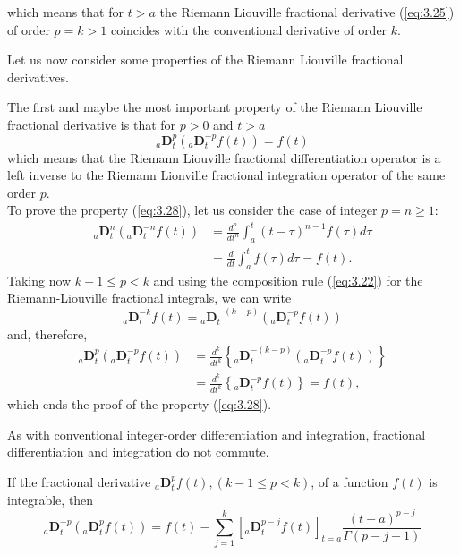 \documentclass[a4paper,14pt,oneside]{book}
\theoremstyle{plain}
\theoremstyle{definition}
\theoremstyle{remark}
\begin{document}
\begin{center}
\begin{flushleft}
\begin{equation}
\end{equation}
which means that for $t>a$ the Riemann Liouville fractional derivative (\ref{eq:3.25}) of order $p=k>1$ coincides with the conventional derivative of order $k$.
\par Let us now consider some properties of the Riemann Liouville fractional derivatives.
\par The first and maybe the most important property of the Riemann Liouville fractional derivative is that for $p>0$ and $t>a$
\begin{equation}\label{eq:3.28}
{ }_{a} \mathbf{D}_{t}^{p}\left({ }_{a} \mathbf{D}_{t}^{-p} f(t)\right)=f(t)
\end{equation}
which means that the Riemann Liouville fractional differentiation operator is a left inverse to the Riemann Lionville fractional integration operator of the same order $p$.\\
To prove the property (\ref{eq:3.28}), let us consider the case of integer $p=n\geq 1$:
$$
\begin{aligned}
{ }_{a} \mathbf{D}_{t}^{n}\left({ }_{a} \mathbf{D}_{t}^{-n} f(t)\right) &=\frac{d^{n}}{d t^{n}} \int_{a}^{t}(t-\tau)^{n-1} f(\tau) d \tau \\
&=\frac{d}{d t} \int_{a}^{t} f(\tau) d \tau=f(t) .
\end{aligned}
$$
Taking now $k-1 \leq p<k$ and using the composition rule (\ref{eq:3.22}) for the Riemann-Liouville fractional integrals, we can write
\begin{equation}\label{eq:3.29}
{ }_{a} \mathbf{D}_{l}^{-k} f(t)={ }_{a} \mathbf{D}_{t}^{-(k-p)}\left({ }_{a} \mathbf{D}_{t}^{-p} f(t)\right)
\end{equation}
and, therefore,
$$
\begin{aligned}
{ }_{a} \mathbf{D}_{t}^{p}\left({ }_{a} \mathbf{D}_{t}^{-p} f(t)\right) &=\frac{d^{k}}{d t^{k}}\left\{{ }_{a} \mathbf{D}_{t}^{-(k-p)}\left({ }_{a} \mathbf{D}_{t}^{-p} f(t)\right)\right\} \\
&=\frac{d^{k}}{d t^{k}}\left\{{ }_{a} \mathbf{D}_{t}^{-p} f(t)\right\}=f(t),
\end{aligned}
$$
which ends the proof of the property (\ref{eq:3.28}).
\par As with conventional integer-order differentiation and integration, fractional differentiation and integration do not commute.
\par If the fractional derivative ${ }_{a} \mathbf{D}_{t}^{p} f(t),(k-1 \leq p<k)$, of a function $f(t)$ is integrable, then
\begin{equation}\label{eq:3.30}
{ }_{a} \mathbf{D}_{t}^{-p}\left({ }_{a} \mathbf{D}_{t}^{p} f(t)\right)=f(t)-\sum_{j=1}^{k}\left[{ }_{a} \mathbf{D}_{t}^{p-j} f(t)\right]_{t=a} \frac{(t-a)^{p-j}}{\Gamma(p-j+1)}
\end{equation}


\end{flushleft}
\end{center}
\end{document}
